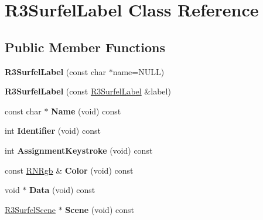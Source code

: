\hypertarget{class_r3_surfel_label}{}\section{R3\+Surfel\+Label Class Reference}
\label{class_r3_surfel_label}
\subsection*{Public Member Functions}
\begin{DoxyCompactItemize}
\item 
{\bfseries R3\+Surfel\+Label} (const char $\ast$name=N\+U\+LL)\hypertarget{class_r3_surfel_label_aebc652da5780d9e2f8905806aa679221}{}\label{class_r3_surfel_label_aebc652da5780d9e2f8905806aa679221}

\item 
{\bfseries R3\+Surfel\+Label} (const \hyperlink{class_r3_surfel_label}{R3\+Surfel\+Label} \&label)\hypertarget{class_r3_surfel_label_a5b8fdefc5f5cb3f9ff0d6fe95a5f6dad}{}\label{class_r3_surfel_label_a5b8fdefc5f5cb3f9ff0d6fe95a5f6dad}

\item 
const char $\ast$ {\bfseries Name} (void) const \hypertarget{class_r3_surfel_label_a41d27293d048c6ed1ccb3f25c4ad7443}{}\label{class_r3_surfel_label_a41d27293d048c6ed1ccb3f25c4ad7443}

\item 
int {\bfseries Identifier} (void) const \hypertarget{class_r3_surfel_label_a70c808d2a3b6cca98edd34e5061ab202}{}\label{class_r3_surfel_label_a70c808d2a3b6cca98edd34e5061ab202}

\item 
int {\bfseries Assignment\+Keystroke} (void) const \hypertarget{class_r3_surfel_label_a780ab05994b400c61b1cd4346ce85c42}{}\label{class_r3_surfel_label_a780ab05994b400c61b1cd4346ce85c42}

\item 
const \hyperlink{class_r_n_rgb}{R\+N\+Rgb} \& {\bfseries Color} (void) const \hypertarget{class_r3_surfel_label_a3e6d13b2fe71252dd7af619cf9330a28}{}\label{class_r3_surfel_label_a3e6d13b2fe71252dd7af619cf9330a28}

\item 
void $\ast$ {\bfseries Data} (void) const \hypertarget{class_r3_surfel_label_ae1d641830fa025556ab0524c3703977d}{}\label{class_r3_surfel_label_ae1d641830fa025556ab0524c3703977d}

\item 
\hyperlink{class_r3_surfel_scene}{R3\+Surfel\+Scene} $\ast$ {\bfseries Scene} (void) const \hypertarget{class_r3_surfel_label_a4244977655cf59428481ad9dccee37dc}{}\label{class_r3_surfel_label_a4244977655cf59428481ad9dccee37dc}


\end{DoxyCompactItemize}

